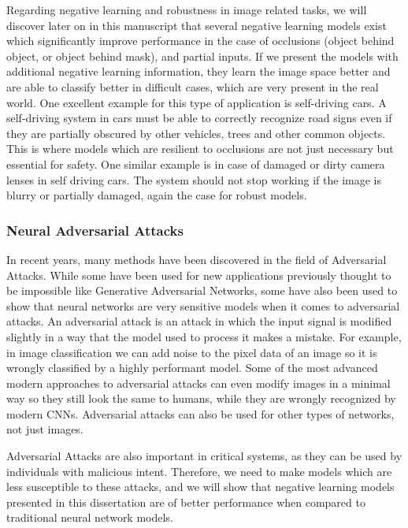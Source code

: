 \documentclass[b5paper]{book}
\begin{document}
Regarding negative learning and robustness in image related tasks, we will discover later on in this manuscript that several negative learning models exist which significantly improve performance in the case of occlusions (object behind object, or object behind mask), and partial inputs. If we present the models with additional negative learning information, they learn the image space better and are able to classify better in difficult cases, which are very present in the real world. One excellent example for this type of application is self-driving cars. A self-driving system in cars must be able to correctly recognize road signs even if they are partially obscured by other vehicles, trees and other common objects. This is where models which are resilient to occlusions are not just necessary but essential for safety. One similar example is in case of damaged or dirty camera lenses in self driving cars. The system should not stop working if the image is blurry or partially damaged, again the case for robust models.

\subsubsection{Neural Adversarial Attacks}

In recent years, many methods have been discovered in the field of Adversarial Attacks. While some have been used for new applications previously thought to be impossible like Generative Adversarial Networks, some have also been used to show that neural networks are very sensitive models when it comes to adversarial attacks. An adversarial attack is an attack in which the input signal is modified slightly in a way that the model used to process it makes a mistake. For example, in image classification we can add noise to the pixel data of an image so it is wrongly classified by a highly performant model. Some of the most advanced modern approaches to adversarial attacks can even modify images in a minimal way so they still look the same to humans, while they are wrongly recognized by modern CNNs. Adversarial attacks can also be used for other types of networks, not just images. 

Adversarial Attacks are also important in critical systems, as they can be used by individuals with malicious intent. Therefore, we need to make models which are less susceptible to these attacks, and we will show that negative learning models presented in this dissertation are of better performance when compared to traditional neural network models.  
\end{document}
